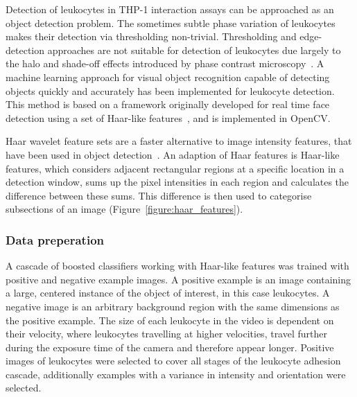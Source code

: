Detection of leukocytes in THP-1 interaction assays can be approached as an object detection problem. The sometimes subtle phase variation of leukocytes makes their detection via thresholding non-trivial. Thresholding and edge-detection approaches are not suitable for detection of leukocytes due largely to the halo and shade-off effects introduced by phase contrast microscopy~\cite{Yin2012}. A machine learning approach for visual object recognition capable of detecting objects quickly and accurately has been implemented for leukocyte detection. This method is based on a framework originally developed for real time face detection using a set of Haar-like features~\cite{Viola2001, Lienhart2002}, and is implemented in OpenCV.

Haar wavelet feature sets are a faster alternative to image intensity features, that have been used in object detection~\cite{Papageorgiou1998}. An adaption of Haar features is Haar-like features, which considers adjacent rectangular regions at a specific location in a detection window, sums up the pixel intensities in each region and calculates the difference between these sums. This difference is then used to categorise subsections of an image (Figure~\ref{figure:haar_features}).

\subsubsection{Data preperation}
A cascade of boosted classifiers working with Haar-like features was trained with positive and negative example images. A positive example is an image containing a large, centered instance of the object of interest, in this case leukocytes. A negative image is an arbitrary background region with the same dimensions as the positive example. The size of each leukocyte in the video is dependent on their velocity, where leukocytes travelling at higher velocities, travel further during the exposure time of the camera and therefore appear longer. Positive images of leukocytes were selected to cover all stages of the leukocyte adhesion cascade, additionally examples with a variance in intensity and orientation were selected.

